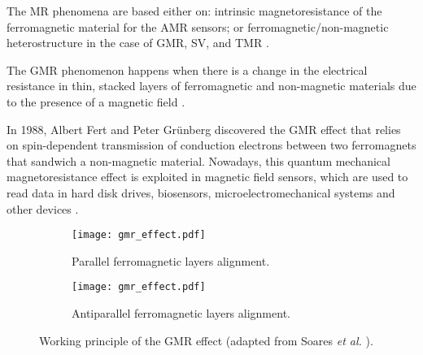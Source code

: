 The \ac{MR} phenomena are based either on: intrinsic magnetoresistance of the ferromagnetic material for the \ac{AMR} sensors; or ferromagnetic/non-magnetic heterostructure in the case of \ac{GMR}, \ac{SV}, and \ac{TMR} \cite{freitas2007magnetoresistive}.


\noindent
The \ac{GMR} phenomenon happens when there is a change in the electrical resistance in thin, stacked layers of ferromagnetic and non-magnetic materials due to the presence of a magnetic field \cite{PhysRevLett.61.2472}.

In 1988, Albert Fert \cite{PhysRevLett.61.2472} and Peter Grünberg \cite{PhysRevB.39.4828} discovered the \ac{GMR} effect that relies on spin-dependent transmission of conduction electrons between two ferromagnets that sandwich a non-magnetic material. Nowadays, this quantum mechanical magnetoresistance effect is exploited in magnetic field sensors, which are used to read data in hard disk drives, biosensors, microelectromechanical systems and other devices \cite{dionne2013gmr}.

\begin{figure}[!ht]
    \centering
    \begin{subfigure}[b]{.49\textwidth}
        \centering
        \texttt{[image: gmr\_effect.pdf]}
        \caption{Parallel ferromagnetic layers alignment.}
        \label{figure:gmr-effect-parallel}
    \end{subfigure}
    \hfill
    \centering
    \begin{subfigure}[b]{.49\textwidth}
        \centering
        \texttt{[image: gmr\_effect.pdf]}
        \caption{Antiparallel ferromagnetic layers alignment.}
        \label{figure:gmr-effect-antiparallel}
    \end{subfigure}
    \caption{Working principle of the GMR effect (adapted from Soares \textit{et al.} \protect\cite{Soares2019}).}
    \label{figure:gmr-effect}
\end{figure}

